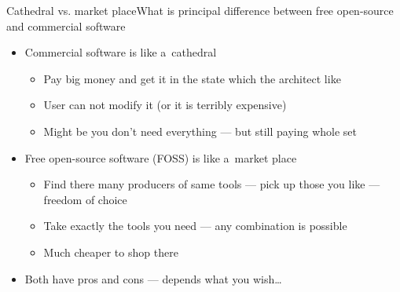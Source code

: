 \documentclass[compress, ucs, xelatex, 11pt, xcolor=svgnames,
  hyperref={
    bookmarks=true,
    unicode=true,
    colorlinks=true,
    pdftitle={Linux, command line and MetaCentrum},
    plainpages=false,
    pdfauthor={Vojtech Zeisek},
    pdfsubject={Course about use of Linux command line, writing shell scripts and using MetaCentrum of CESNET},
    pdfcreator={XeLaTeX},
    pdfkeywords={Linux, GNU, BASH, shell, command line, MetaCentrum},
    linkcolor=DarkRed,
    anchorcolor=DarkBlue,
    citecolor=Indigo,
    filecolor=NavyBlue,
    menucolor=DarkMagenta,
    urlcolor=DarkBlue,
    pdftex},
  url={hyphens, lowtilde} %
  ]{beamer}
\begin{document}
\begin{frame}{Cathedral vs. market place}{What is principal difference between free open-source and commercial software}
  \begin{itemize}
    \item Commercial software is like a~cathedral
    \begin{itemize}
      \item Pay big money and get it in the state which the architect like
      \item User can not modify it (or it is terribly expensive)
      \item Might be you don't need everything --- but still paying whole set
    \end{itemize}
    \item Free open-source software (FOSS) is like a~market place
    \begin{itemize}
      \item Find there many producers of same tools --- pick up those you like --- freedom of choice
      \item Take exactly the tools you need --- any combination is possible
      \item Much cheaper to shop there
    \end{itemize}
    \item Both have pros and cons --- depends what you wish\ldots
  \end{itemize}
\end{frame}
\end{document}
